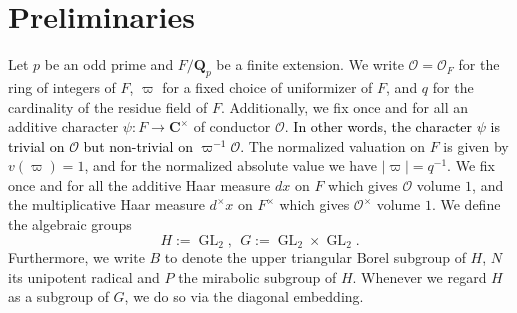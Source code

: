 \documentclass{amsart}
\theoremstyle{plain}
\theoremstyle{plain}
\theoremstyle{remark}
\DeclareMathOperator{\GL}{GL}
\begin{document}
\section{Preliminaries}\label{sec 2}
Let $p$ be an odd prime and $F/\mathbf{Q}_p$ be a finite extension. We write $\mathcal{O}=\mathcal{O}_F$ for the ring of integers of $F$, $\varpi$ for a fixed choice of uniformizer of $F$, and $q$ for the cardinality of the residue field of $F$. Additionally, we fix once and for all an additive character $\psi:F\rightarrow \mathbf{C}^\times$ of conductor $\mathcal{O}$. \textcolor{black}{In other words, the character $\psi$ is trivial on $\mathcal{O}$ but non-trivial on $\varpi^{-1}\mathcal{O}$.} The normalized valuation on $F$ is given by $v(\varpi)=1$, and for the normalized absolute value we have $|\varpi|=q^{-1}$. We fix once and for all the additive Haar measure $dx$ on $F$ which gives $\mathcal{O}$ volume $1$, and the multiplicative Haar measure $d^\times x$ on $F^\times$ which gives $\mathcal{O}^\times$ volume $1$.
We define the algebraic groups
    $$H:=\GL_2,\ \ G:=\GL_2\times \GL_2.$$
Furthermore, we write $B$ to denote the upper triangular Borel subgroup of $H$, $N$ its unipotent radical and $P$ the  mirabolic subgroup of $H$. Whenever we regard $H$ as a subgroup of $G$, we do so via the diagonal embedding.
\end{document}
